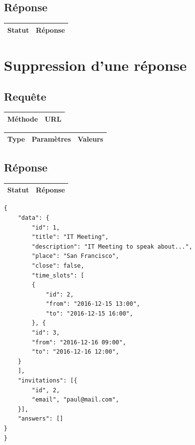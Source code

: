 \documentclass[titlepage]{report}
\begin{document}
\section{Réponse}

\begin{center}
	\begin{tabular}{|c|c|}
		\hline
		Statut & Réponse \\
		\hline
		
	\end{tabular}
\end{center}


\chapter{Suppression d'une réponse}

\section{Requête}

\begin{center}
	\begin{tabular}{|c|c|}
		\hline
		Méthode & URL \\
		\hline
		
	\end{tabular}
\end{center}


\begin{center}
	\begin{tabular}{|c|c|c|}
		\hline
		Type & Paramètres & Valeurs \\
		\hline
		
	\end{tabular}
\end{center}


\section{Réponse}

\begin{center}
	\begin{tabular}{|c|c|}
		\hline
		Statut & Réponse \\
		\hline
		
	\end{tabular}
\end{center}


\lstset{language=XML} 

\begin{lstlisting}[frame=single]
{
	"data": {
		"id": 1,
		"title": "IT Meeting",
		"description": "IT Meeting to speak about...",
		"place": "San Francisco",
		"close": false,
		"time_slots": [
		{
			"id": 2,
			"from": "2016-12-15 13:00",
			"to": "2016-12-15 16:00",
		}, {
		"id": 3,
		"from": "2016-12-16 09:00",
		"to": "2016-12-16 12:00",
	}
	],
	"invitations": [{
		"id", 2,
		"email", "paul@mail.com",
	}],
	"answers": []
}
}

\end{lstlisting}
\end{document}
